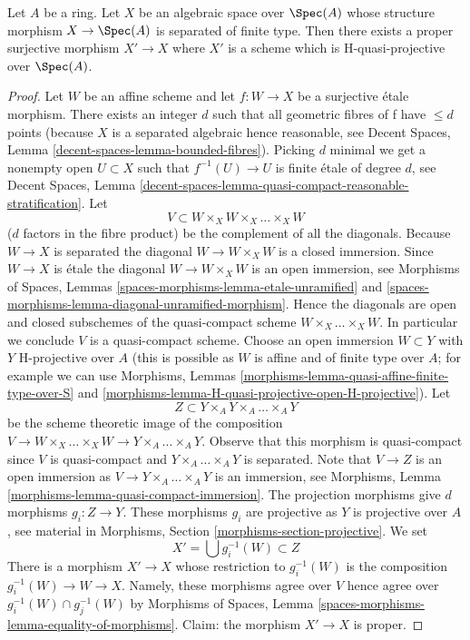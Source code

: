 %
\begin{lemma}
\label{lemma-weak-chow}
Let $A$ be a ring. Let $X$ be an algebraic space over $\Spec(A)$
whose structure morphism $X \to \Spec(A)$ is separated of finite type.
Then there exists a proper surjective morphism $X' \to X$
where $X'$ is a scheme which is H-quasi-projective over $\Spec(A)$.
\end{lemma}

\begin{proof}
Let $W$ be an affine scheme and let $f : W \to X$ be a surjective
\'etale morphism. There exists an integer $d$ such that all geometric
fibres of f have $\leq d$ points (because $X$ is a separated algebraic
hence reasonable, see
Decent Spaces, Lemma \ref{decent-spaces-lemma-bounded-fibres}).
Picking $d$ minimal we get a nonempty open $U \subset X$ such that
$f^{-1}(U) \to U$ is finite \'etale of degree $d$, see
Decent Spaces, Lemma
\ref{decent-spaces-lemma-quasi-compact-reasonable-stratification}.
Let
$$
V \subset W \times_X W \times_X \ldots \times_X W
$$
($d$ factors in the fibre product) be the complement of all the diagonals.
Because $W \to X$ is separated the diagonal $W \to W \times_X W$ is a
closed immersion. Since $W \to X$ is \'etale the diagonal
$W \to W \times_X W$ is an open immersion, see
Morphisms of Spaces, Lemmas
\ref{spaces-morphisms-lemma-etale-unramified} and
\ref{spaces-morphisms-lemma-diagonal-unramified-morphism}.
Hence the diagonals are open and closed subschemes
of the quasi-compact scheme $W \times_X \ldots \times_X W$.
In particular we conclude $V$ is a quasi-compact scheme.
Choose an open immersion $W \subset Y$ with $Y$ H-projective over
$A$ (this is possible as $W$ is affine and of finite type over $A$;
for example we can use
Morphisms, Lemmas
\ref{morphisms-lemma-quasi-affine-finite-type-over-S} and
\ref{morphisms-lemma-H-quasi-projective-open-H-projective}).
Let
$$
Z \subset Y \times_A Y \times_A \ldots \times_A Y
$$
be the scheme theoretic image of the composition
$V \to W \times_X \ldots \times_X W \to Y \times_A \ldots \times_A Y$.
Observe that this morphism is quasi-compact since $V$ is quasi-compact
and $Y \times_A \ldots \times_A Y$ is separated.
Note that $V \to Z$ is an open immersion as
$V \to Y \times_A \ldots \times_A Y$ is an immersion, see
Morphisms, Lemma \ref{morphisms-lemma-quasi-compact-immersion}.
The projection morphisms give $d$ morphisms $g_i : Z \to Y$.
These morphisms $g_i$ are projective as $Y$ is projective over $A$, see
material in Morphisms, Section \ref{morphisms-section-projective}.
We set
$$
X' = \bigcup g_i^{-1}(W) \subset Z
$$
There is a morphism $X' \to X$ whose restriction to $g_i^{-1}(W)$ is
the composition $g_i^{-1}(W) \to W \to X$.
Namely, these morphisms agree over $V$ hence agree over
$g_i^{-1}(W) \cap g_j^{-1}(W)$ by
Morphisms of Spaces, Lemma \ref{spaces-morphisms-lemma-equality-of-morphisms}.
Claim: the morphism $X' \to X$ is proper.


\end{proof}
